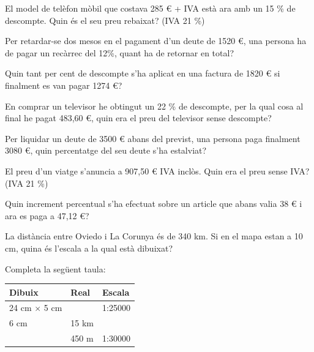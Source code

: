 \begin{activitats}
\begin{mylist}




\exer
  El model de telèfon mòbil que costava 285 \euro{} + IVA està ara amb
  un 15 \% de descompte. Quin és el seu preu rebaixat? (IVA 21 \%)
  
  
\exer
  Per retardar-se dos mesos en el pagament d'un deute de 1520 \euro{},
  una persona ha de pagar un recàrrec del 12\%, quant ha de retornar en
  total?
  
  
\exer
  Quin tant per cent de descompte s'ha aplicat en una factura de 1820
  \euro{} si finalment es van pagar 1274 \euro{}?
  
  
\exer
  En comprar un televisor he obtingut un 22 \% de descompte, per la qual
  cosa al final he pagat 483,60 \euro{}, quin era el preu del televisor
  sense descompte?
  \answers{620 \euro{}}
  
  
 \pagebreak
  
\exer
  Per liquidar un deute de 3500 \euro{} abans del previst, una persona
  paga finalment 3080 \euro{}, quin percentatge del seu deute s'ha
  estalviat?
  
  
\exer
  El preu d'un viatge s'anuncia a 907,50 \euro{} IVA inclòs. Quin era el
  preu sense IVA? (IVA 21 \%)
  
  
\exer
  Quin increment percentual s'ha efectuat sobre un article que abans
  valia 38 \euro{} i ara es paga a 47,12 \euro{}?
  
  
\exer
  La distància entre Oviedo i La Corunya és de 340 km. Si en el mapa
  estan a 10 cm, quina és l'escala a la qual està dibuixat?
 


\exer
 Completa la següent taula:


\begin{tabular}[]{@{}l|l|l@{}}
\toprule
\textbf{Dibuix} & \textbf{Real} &
\textbf{Escala}\tabularnewline  
\midrule
24 cm $\times$ 5 cm & & 1:25000\tabularnewline \hline
6 cm & 15 km &\tabularnewline \hline
& 450 m & 1:30000\tabularnewline 
\bottomrule
\end{tabular}





\end{mylist}
\end{activitats}
